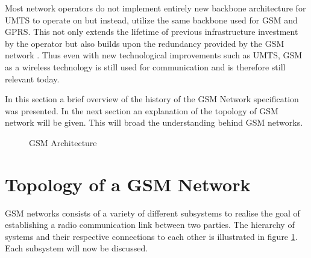 Most network operators do not implement entirely new backbone architecture for UMTS to operate on but instead, utilize the same backbone used for GSM and GPRS. This not only extends the lifetime of previous infrastructure investment by the operator but also builds upon the redundancy provided by the GSM network \cite{GSMArchitectureProtocolsServices}. Thus even with new technological improvements such as UMTS, GSM as a wireless technology is still used for communication and is therefore still relevant today.

In this section a brief overview of the history of the GSM Network specification was presented. In the next section an explanation of the topology of GSM network will be given. This will broad the understanding behind GSM networks.

\begin{figure}[hptb]
	\begin{centering}
		
		\caption{GSM Architecture}
		\label{fig:GSMArchitecture}
	\end{centering}
\end{figure}

\section{Topology of a GSM Network}
\label{sec:GSMArch}
GSM networks consists of a variety of different subsystems to realise the goal of establishing a radio communication link between two parties. The hierarchy of systems and their respective connections to each other is illustrated in figure \ref{fig:GSMArchitecture}. Each subsystem will now be discussed.
